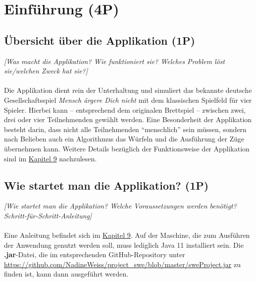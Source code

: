 
\titlespacing*{\chapter}{0pt}{-30mm}{10pt}
  
\chapter{Einführung (4P)}
\pagestyle{scrheadings}
\clearscrheadfoot
{}
\setcounter{page}{1}
\ofoot[\pagemark]{\pagemark}
\onehalfspacing

\section{Übersicht über die Applikation (1P)}
\emph{[Was macht die Applikation? Wie funktioniert sie? Welches Problem löst sie/welchen Zweck hat sie?]}
\\
\\
\noindent Die Applikation dient rein der Unterhaltung und simuliert das bekannte deutsche Gesell\-schaftsspiel \emph{Mensch ärgere Dich nicht} mit dem klassischen Spielfeld für vier Spieler. Hierbei kann -- entsprechend dem originalen Brettspiel -- zwischen zwei, drei oder vier Teilnehmenden gewählt werden. Eine Besonderheit der Applikation besteht darin, dass nicht alle Teilnehmenden \enquote{menschlich} sein müssen, sondern nach Belieben auch ein Algorithmus das Würfeln und die Ausführung der Züge übernehmen kann. Weitere Details bezüglich der Funktionsweise der Applikation sind im \hyperref[ch:anleitung]{Kapitel 9} nachzulesen. %

\section{Wie startet man die Applikation? (1P)}
\emph{[Wie startet man die Applikation? Welche Voraussetzungen werden benötigt? Schritt-für-Schritt-Anleitung]}
\\
\\
\noindent Eine Anleitung befindet sich im \hyperref[ch:anleitung]{Kapitel 9}. Auf der Maschine, die zum Ausführen der Anwendung genutzt werden soll, muss lediglich Java 11 installiert sein. Die \textbf{\textbf{.jar}}-Datei, die im entsprechenden GitHub-Repository unter \url{https://github.com/NadineWeiss/project_swe/blob/master/sweProject.jar} zu finden ist, kann dann ausgeführt werden.

